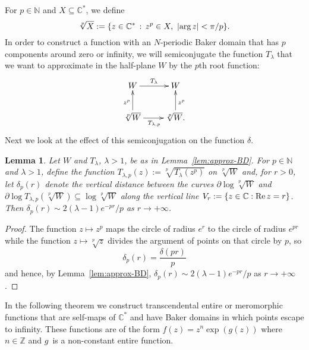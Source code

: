 \documentclass[a4paper, 12pt, reqno]{amsart}
\numberwithin{equation}{section}
\theoremstyle{plain}
\newtheorem{lem}[thm]{Lemma}
\theoremstyle{definition}
\theoremstyle{remark}
\newcommand{\C}{{\mathbb{C}}}
\newcommand{\Z}{{\mathbb{Z}}}
\newcommand{\N}{{\mathbb{N}}}
\begin{document}
For $p\in\N$ and $X\subseteq \C^*$, we define
$$
\sqrt[p]{X}:=\{z\in\C^*\, :\, z^p\in X,\ |\textup{arg}\,z|<\pi/p\}.
$$
In order to construct a function with an $N$-periodic Baker domain that has $p$ components around zero or infinity, we will semiconjugate the function $T_\lambda$ that we want to approximate in the half-plane $W$ by the $p$th root function:
$$
\xymatrix{
W \ar[r]^{T_\lambda}  & W\\
\sqrt[p]{W} \ar[u]^{z^p} \ar[r]_{T_{\lambda,p}} & \sqrt[p]{W}. \ar[u]_{z^p}
}
$$
Next we look at the effect of this semiconjugation on the function $\delta$.

\begin{lem}
Let $W$ and $T_\lambda$, $\lambda>1$, be as in Lemma~\ref{lem:approx-BD}. For $p\in\N$ and $\lambda>1$, define the function $T_{\lambda,p}(z):=\sqrt[p]{T_\lambda(z^p)}$ on $\sqrt[p]{W}$ and, for $r>0$, let $\delta_{p}(r)$ denote the vertical distance between the curves $\partial \log \sqrt[p]{W}$ and $\partial \log T_{\lambda,p}(\sqrt[p]{W})\subseteq \log \sqrt[p]{W}$ along the vertical line \mbox{$V_r:=\{z\in\C : \textup{Re}\, z=r\}$}. Then $\delta_{p}(r)\sim 2(\lambda-1)e^{-pr}/p$ as $r\to+\infty$.
\label{lem:approx-root-BD}
\end{lem}
\begin{proof}
The function $z\mapsto z^p$ maps the circle of radius $e^r$ to the circle of radius $e^{pr}$ while the function $z\mapsto \sqrt[p]{z}$ divides the argument of points on that circle by $p$, so
$$
\delta_{p}(r)=\frac{\delta(pr)}{p}
$$
and hence, by Lemma~\ref{lem:approx-BD}, $\delta_{p}(r)\sim 2(\lambda-1)e^{-pr}/p$ as $r\to+\infty$.
\end{proof}

In the following theorem we construct transcendental entire or meromorphic functions that are self-maps of $\C^*$ and have Baker domains in which points escape to infinity. These functions are of the form $f(z)=z^n\exp(g(z))$ where $n\in\Z$ and $g$~is a non-constant entire function. 
\end{document}

